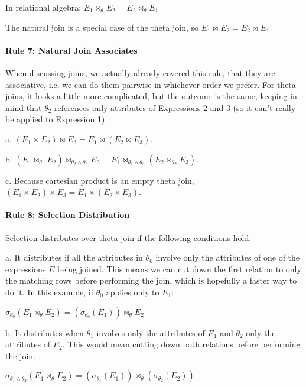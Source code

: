 In relational algebra: $E_{1} \bowtie_{\theta} E_{2} = E_{2} \bowtie_{\theta} E_{1}$

The natural join is a special case of the theta join, so $E_{1} \bowtie E_{2} = E_{2} \bowtie E_{1}$

\paragraph{Rule 7: Natural Join Associates}
When discussing joins, we actually already covered this rule, that they are associative, i.e. we can do them pairwise in whichever order we prefer. For theta joins, it looks a little more complicated, but the outcome is the same, keeping in mind that $\theta_{2}$ references only attributes of Expressions 2 and 3 (so it can't really be applied to Expression 1).


a. $(E_{1} \bowtie E_{2}) \bowtie E_{3} = E_{1} \bowtie (E_{2} \bowtie E_{3})$. 

b. $(E_{1} \bowtie_{\theta_{1}} E_{2}) \bowtie_{\theta_{2}\wedge\theta_{3}} E_{3} = E_{1} \bowtie_{\theta_{1}\wedge\theta_{3}} (E_{2} \bowtie_{\theta_{2}} E_{3})$. 

c. Because cartesian product is an empty theta join, $(E_{1} \times E_{2}) \times E_{3} = E_{1} \times (E_{2} \times E_{3})$. 


\paragraph{Rule 8: Selection Distribution}
Selection distributes over theta join if the following conditions hold:

a. It distributes if all the attributes in $\theta_{0}$ involve only the attributes of one of the expressions $E$ being joined. This means we can cut down the first relation to only the matching rows before performing the join, which is hopefully a faster way to do it. In this example, if $\theta_{0}$ applies only to $E_{1}$:

$\sigma_{\theta_{0}}(E_{1} \bowtie_{\theta} E_{2}) = (\sigma_{\theta_{0}}(E_{1})) \bowtie_{\theta} E_{2}$ 

b. It distributes when $\theta_{1}$ involves only the attributes of $E_{1}$ and $\theta_{2}$ only the attributes of $E_{2}$. This would mean cutting down both relations before performing the join.

$\sigma_{\theta_{1}\wedge\theta_{2}} (E_{1} \bowtie_{\theta} E_{2}) = (\sigma_{\theta_{1}}(E_{1})) \bowtie_{\theta} (\sigma_{\theta_{2}}(E_{2})) $

